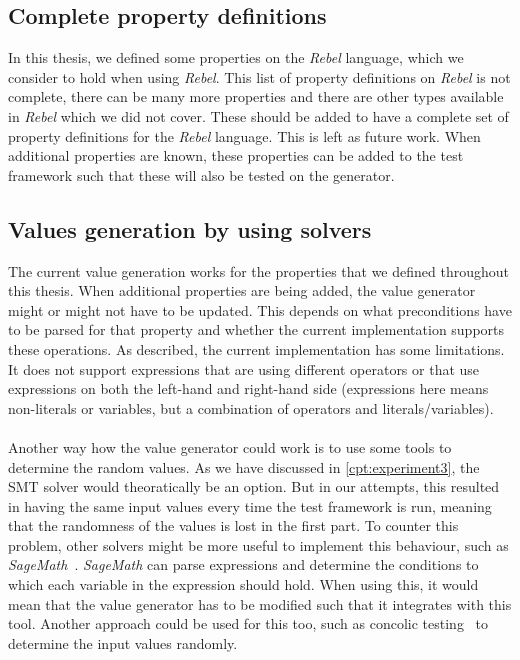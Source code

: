 \subsection*{Complete property definitions}
In this thesis, we defined some properties on the \textit{Rebel} language,
which we consider to hold when using \textit{Rebel}. This list of property
definitions on \textit{Rebel} is not complete, there can be many more properties
and there are other types available in \textit{Rebel} which we did not cover.
These should be added to have a complete set of property definitions for the
\textit{Rebel} language. This is left as future work. When additional properties
are known, these properties can be added to the test framework such that these
will also be tested on the generator.

\subsection*{Values generation by using solvers}
The current value generation works for the properties that we defined throughout this thesis. When additional properties are being added, the value generator might or might not have to be updated. This depends on what preconditions have to be parsed for that property and whether the current implementation supports these operations. As described, the current implementation has some limitations. It does not support expressions that are using different operators or that use expressions on both the left-hand and right-hand side (expressions here means non-literals or variables, but a combination of operators and literals/variables).\\
\\
Another way how the value generator could work is to use some tools to determine the random values. As we have discussed in \autoref{cpt:experiment3}, the SMT solver would theoratically be an option. But in our attempts, this resulted in having the same input values every time the test framework is run, meaning that the randomness of the values is lost in the first part. To counter this problem, other solvers might be more useful to implement this behaviour, such as \textit{SageMath}~\cite{siteSageMath2017}. \textit{SageMath} can parse expressions and determine the conditions to which each variable in the expression should hold. When using this, it would mean that the value generator has to be modified such that it integrates with this tool. Another approach could be used for this too, such as concolic testing~\cite{sen2006cute} to determine the input values randomly. %

